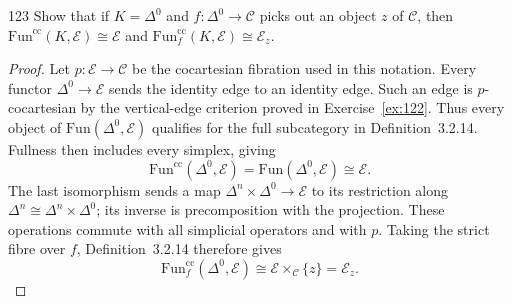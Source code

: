 \begin{exercise}{123}
Show that if $K=\Delta^0$ and $f\colon\Delta^0\to\mathcal C$ picks out an object $z$ of $\mathcal C$, then
$\mathrm{Fun}^{\mathrm{cc}}(K,\mathcal E)\cong\mathcal E$ and $\mathrm{Fun}^{\mathrm{cc}}_f(K,\mathcal E)\cong\mathcal E_z$.

\begin{proof}
Let $p\colon\mathcal E\to\mathcal C$ be the cocartesian fibration used in this notation.
Every functor $\Delta^0\to\mathcal E$ sends the identity edge to an identity edge.
Such an edge is $p$-cocartesian by the vertical-edge criterion proved in
Exercise~\ref{ex:122}.
Thus every object of $\mathrm{Fun}(\Delta^0,\mathcal E)$ qualifies for the
full subcategory in Definition~3.2.14.
Fullness then includes every simplex, giving
\[
 \mathrm{Fun}^{\mathrm{cc}}(\Delta^0,\mathcal E)
 =\mathrm{Fun}(\Delta^0,\mathcal E)\cong\mathcal E.
\]
The last isomorphism sends a map $\Delta^n\times\Delta^0\to\mathcal E$
to its restriction along $\Delta^n\cong\Delta^n\times\Delta^0$;
its inverse is precomposition with the projection.
These operations commute with all simplicial operators and with $p$.
Taking the strict fibre over $f$, Definition~3.2.14 therefore gives
\[
 \mathrm{Fun}^{\mathrm{cc}}_f(\Delta^0,\mathcal E)
 \cong\mathcal E\times_{\mathcal C}\{z\}=\mathcal E_z.
\]
\end{proof}
\end{exercise}
